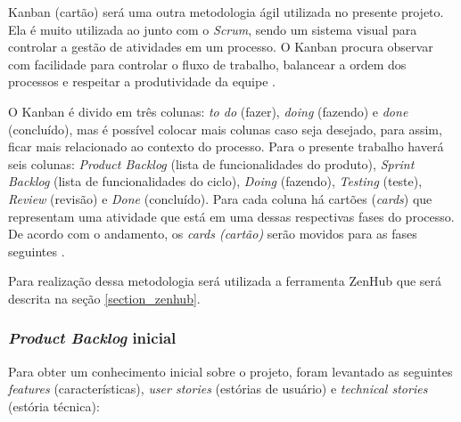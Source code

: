 Kanban (cartão) será uma outra metodologia ágil utilizada no presente projeto. Ela é muito utilizada ao junto com o \textit{Scrum}, sendo um sistema visual para controlar a gestão de atividades em um processo. O Kanban procura observar com facilidade para controlar o fluxo de trabalho, balancear a ordem dos processos e respeitar a produtividade da equipe \cite{ARTIA:2019}.

O Kanban é divido em três colunas: \textit{to do} (fazer), \textit{doing} (fazendo) e \textit{done} (concluído), mas é possível colocar mais colunas caso seja desejado, para assim, ficar mais relacionado ao contexto do processo. Para o presente trabalho haverá seis colunas: \textit{Product Backlog} (lista de funcionalidades do produto), \textit{Sprint Backlog} (lista de funcionalidades do ciclo), \textit{Doing} (fazendo), \textit{Testing} (teste), \textit{Review} (revisão) e \textit{Done} (concluído). Para cada coluna há cartões (\textit{cards}) que representam uma atividade que está em uma dessas respectivas fases do processo. De acordo com o andamento, os \textit{cards (cartão)} serão movidos para as fases seguintes \cite{ARTIA:2019}.

Para realização dessa metodologia será utilizada a ferramenta ZenHub que será descrita na seção \ref{section_zenhub}.

\subsubsection{\textit{Product Backlog} inicial}
\label{section_product_backlog}

Para obter um conhecimento inicial sobre o projeto, foram levantado as seguintes \textit{features} (características), \textit{user stories} (estórias de usuário) e \textit{technical stories} (estória técnica):

